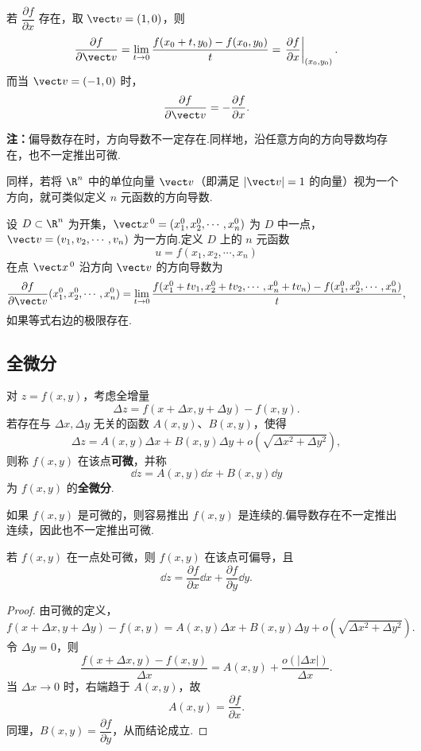 若 $\dfrac{\partial f}{\partial x}$ 存在，取 $\vect v=(1,0)$，则
\[
\frac{\partial f}{\partial\vect v}
=\lim_{t\to0}\frac{f(x_0+t,y_0)-f(x_0,y_0)}{t}
=\left.\frac{\partial f}{\partial x}\right|_{(x_0,y_0)}.
\]
而当 $\vect v=(-1,0)$ 时，
\[
\frac{\partial f}{\partial\vect v}=-\frac{\partial f}{\partial x}.
\]


	\textbf{注：}偏导数存在时，方向导数不一定存在.同样地，沿任意方向的方向导数均存在，也不一定推出可微.


同样，若将 $\R^n$ 中的单位向量 $\vect v$（即满足 $|\vect v|=1$ 的向量）视为一个方向，就可类似定义 $n$ 元函数的方向导数.

\begin{definition}
	设 $D\subset\R^n$ 为开集，$\vect x^{\,0}=(x_1^0,x_2^0,\cdots,x_n^0)$ 为 $D$ 中一点，$\vect v=(v_1,v_2,\cdots,v_n)$ 为一方向.定义 $D$ 上的 $n$ 元函数
	\[
	u=f(x_1,x_2,\cdots,x_n)
	\]
	在点 $\vect x^{\,0}$ 沿方向 $\vect v$ 的方向导数为
	\[
	\frac{\partial f}{\partial\vect v}(x_1^0,x_2^0,\cdots,x_n^0)
	=\lim_{t\to0}
	\frac{f(x_1^0+tv_1,x_2^0+tv_2,\cdots,x_n^0+tv_n)-f(x_1^0,x_2^0,\cdots,x_n^0)}{t},
	\]
	如果等式右边的极限存在.
\end{definition}

\subsection*{全微分}

\begin{definition}
	对 $z=f(x,y)$，考虑全增量
\[
\Delta z=f(x+\Delta x,y+\Delta y)-f(x,y).
\]
若存在与 $\Delta x,\Delta y$ 无关的函数 $A(x,y)$、$B(x,y)$，使得
\[
\Delta z=A(x,y)\Delta x+B(x,y)\Delta y
+o\!\left(\sqrt{\Delta x^2+\Delta y^2}\right),
\]
则称 $f(x,y)$ 在该点\textbf{可微}，并称
\[
\dd z=A(x,y)\dd x+B(x,y)\dd y
\]
为 $f(x,y)$ 的\textbf{全微分}.
\end{definition}

如果 $f(x,y)$ 是可微的，则容易推出 $f(x,y)$ 是连续的.偏导数存在不一定推出连续，因此也不一定推出可微.

\begin{proposition}
若 $f(x,y)$ 在一点处可微，则 $f(x,y)$ 在该点可偏导，且
\[
\dd z=\frac{\partial f}{\partial x}\dd x+\frac{\partial f}{\partial y}\dd y.
\]
\end{proposition}

\begin{proof}
由可微的定义，
\[
f(x+\Delta x,y+\Delta y)-f(x,y)
=A(x,y)\Delta x+B(x,y)\Delta y
+o\!\left(\sqrt{\Delta x^2+\Delta y^2}\right).
\]
令 $\Delta y=0$，则
\[
\frac{f(x+\Delta x,y)-f(x,y)}{\Delta x}
=A(x,y)+\frac{o(|\Delta x|)}{\Delta x}.
\]
当 $\Delta x\to0$ 时，右端趋于 $A(x,y)$，故
\[
A(x,y)=\frac{\partial f}{\partial x}.
\]
同理，$B(x,y)=\dfrac{\partial f}{\partial y}$，从而结论成立.
\end{proof}

